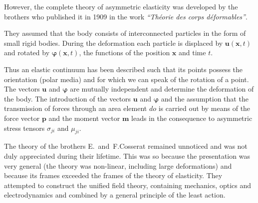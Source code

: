 \begin{otherlanguage}{russian}
\begin{tcolorbox}[breakable, enhanced, colback = orange!8, before upper={\parindent3.2ex}, parbox = false]
However, the complete theory of asymmetric elasticity was developed by the brothers  who published it in 1909 in the work \textit{“Théorie des corps déformables”}.

They assumed that the body consists of interconnected particles in the form of small rigid bodies. During the deformation each particle is displaced by $\bm{u}(\bm{x},t)$ and rotated by $\bm{\varphi}(\bm{x},t)$, the functions of the position $\bm{x}$ and time $t$.

Thus an elastic continuum has been described such that its points possess the orientation (polar media) and for which we can speak of the rotation of a point. The vectors $\bm{u}$ and $\bm{\varphi}$ are mutually independent and determine the deformation of the body. The introduction of the vectors $\bm{u}$ and $\bm{\varphi}$ and the assumption that the transmission of forces through an area element $do$ is carried out by means of the force vector $\bm{p}$ and the moment vector $\bm{m}$ leads in the consequence to asymmetric stress tensors $\sigma_{ji}$ and $\mu_{ji}$.

The theory of the brothers E.~and~F.\;Cosserat remained unnoticed and was not duly appreciated during their lifetime. This was so because the presentation was very general (the theory was non-linear, including large deformations) and because its frames exceeded the frames of the theory of elasticity. They attempted to construct the unified field theory, containing mechanics, optics and electrodynamics and combined by a general principle of the least action.


\end{tcolorbox}
\end{otherlanguage}
